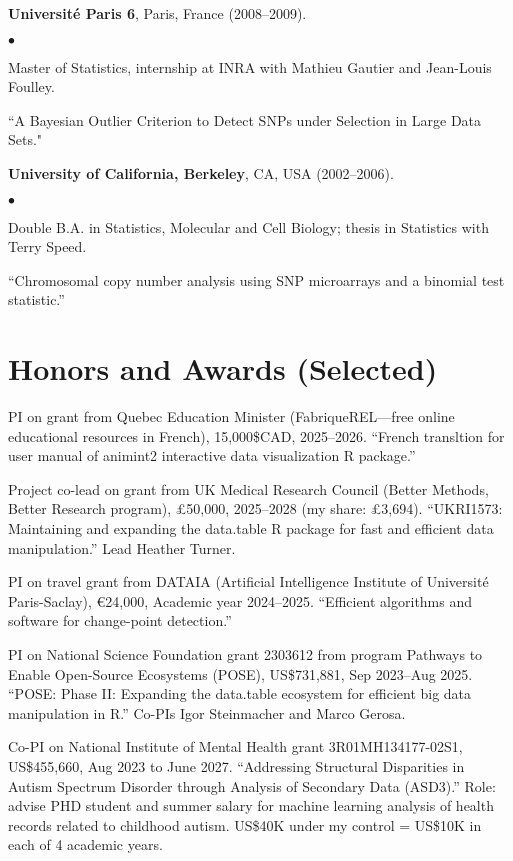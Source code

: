 \documentclass[margin,line]{res}
\newenvironment{list2}{
  \begin{list}{$\bullet$}{%
      \setlength{\itemsep}{0in}
      \setlength{\parsep}{0in} \setlength{\parskip}{0in}
      \setlength{\topsep}{0in} \setlength{\partopsep}{0in} 
      \setlength{\leftmargin}{0.2in}}}{\end{list}}
\begin{document}
\begin{resume}
{\bf Universit\'e Paris 6}, Paris, France (2008--2009).\\
\vspace*{-.1in}
\begin{list2}
\item[] Master of Statistics, internship at INRA with Mathieu Gautier and Jean-Louis Foulley.
\item[] ``A Bayesian Outlier Criterion to Detect SNPs under Selection in Large Data Sets."
\end{list2}

{\bf University of California, Berkeley}, CA, USA (2002--2006).\\
\vspace*{-.1in}
\begin{list2}
\item[] Double B.A. in Statistics, Molecular and Cell Biology; thesis in Statistics with Terry Speed.
\item[] ``Chromosomal copy number analysis using SNP microarrays and a binomial test statistic.'' 
\end{list2}

\section{\sc Honors and Awards (Selected)}

PI on grant from Quebec Education Minister (FabriqueREL---free online
educational resources in French), 15,000\$CAD, 2025--2026. ``French
transltion for user manual of animint2 interactive data visualization
R package.''

Project co-lead on grant from UK Medical Research Council (Better
Methods, Better Research program), £50,000, 2025--2028 (my share:
£3,694). ``UKRI1573: Maintaining and expanding the data.table R
package for fast and efficient data manipulation.'' Lead Heather
Turner.

PI on travel grant from DATAIA (Artificial Intelligence Institute of
Université Paris-Saclay), €24,000, Academic year
2024--2025. ``Efficient algorithms and software for change-point
detection.''

PI on National Science Foundation grant 2303612 from program Pathways to Enable Open-Source Ecosystems (POSE), US\$731,881, Sep
2023--Aug 2025. ``POSE: Phase II: Expanding the data.table ecosystem
for efficient big data manipulation in R.'' Co-PIs Igor Steinmacher
and Marco Gerosa.

Co-PI on National Institute of Mental Health grant 3R01MH134177-02S1,
US\$455,660, Aug 2023 to June 2027. ``Addressing Structural Disparities in Autism Spectrum Disorder through Analysis of Secondary Data (ASD3).'' Role: advise PHD student and summer salary for
machine learning analysis of health records related to childhood
autism. US\$40K under my control = US\$10K in each of 4 academic
years.


\end{resume}
\end{document}
